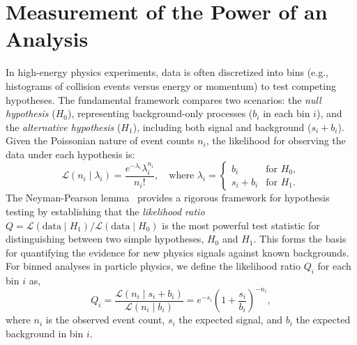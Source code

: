 \section{Measurement of the Power of an Analysis}
\label{sec:power_analysis}

In high-energy physics experiments, data is often discretized into bins (e.g., histograms of collision events versus energy or momentum) to test competing hypotheses. The fundamental framework compares two scenarios: the \textit{null hypothesis} ($H_0$), representing background-only processes ($b_i$ in each bin $i$), and the \textit{alternative hypothesis} ($H_1$), including both signal and background ($s_i + b_i$). Given the Poissonian nature of event counts $n_i$, the likelihood for observing the data under each hypothesis is:
\begin{equation}
    \mathcal{L}(n_i \mid \lambda_i) = \frac{e^{-\lambda_i} \lambda_i^{n_i}}{n_i!}, \quad \text{where } \lambda_i = 
    \begin{cases}
        b_i & \text{for } H_0, \\
        s_i + b_i & \text{for } H_1.
    \end{cases}
\end{equation}
The Neyman-Pearson lemma~\parencite{NeymanPearson1933} provides a rigorous framework for hypothesis testing by establishing that the \textit{likelihood ratio} $Q = \mathcal{L}(\text{data} \mid H_1)/\mathcal{L}(\text{data} \mid H_0)$ is the most powerful test statistic for distinguishing between two simple hypotheses, $H_0$ and $H_1$. This forms the basis for quantifying the evidence for new physics signals against known backgrounds. For binned analyses in particle physics, we define the likelihood ratio $Q_i$ for each bin $i$ as,
\begin{equation}
Q_i = \frac{\mathcal{L}(n_i \mid s_i + b_i)}{\mathcal{L}(n_i \mid b_i)} = e^{-s_i} \left( 1+\frac{s_i}{b_i} \right)^{-n_i},
\end{equation}
where $n_i$ is the observed event count, $s_i$ the expected signal, and $b_i$ the expected background in bin $i$. 


